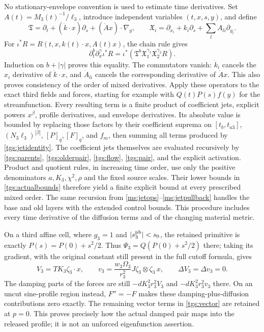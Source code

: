No stationary-envelope convention is used to estimate time
derivatives. Set $A(t)=M_3(t)^{-1}/\ell_3$, introduce independent
variables $(t,x,s,y)$, and define
\begin{equation}\label{tgs:jetoperators}
 \mathfrak T=\partial_t+(\dot k\cdot x)\partial_s
                       +(\dot A x)\cdot\nabla_y,\qquad
 \mathfrak X_i=\partial_{x_i}+k_i\partial_s
                       +\sum_lA_{li}\partial_{y_l}.
\end{equation}
For $\iota^*R=R(t,x,k(t)\cdot x,A(t)x)$, the chain rule gives
\begin{equation}\label{tgs:jetidentity}
 \partial_t^b\partial_x^\gamma\iota^*R
   =\iota^*(\mathfrak T^b\mathfrak X_1^{\gamma_1}
                              \mathfrak X_2^{\gamma_2}R).
\end{equation}
Induction on $b+|\gamma|$ proves this equality. The commutators
vanish: $\dot k_i$ cancels the $x_i$ derivative of
$\dot k\cdot x$, and $\dot A_{li}$ cancels the corresponding
derivative of $\dot A x$. This also proves consistency of the
order of mixed derivatives.
Apply these operators to the exact third fields and forces,
starting for example with $Q(t)P(s)f(y)$ for the streamfunction.
Every resulting term is a finite product of coefficient jets,
explicit powers $x^\beta$, profile derivatives, and envelope
derivatives. Its absolute value is bounded by replacing those
factors by their coefficient suprema on $[t_b,t_{a3}]$,
$(N_3\ell_3)^{|\beta|}$, $[P]_q,[F]_q$, and $f_m$,
then summing all terms produced by \eqref{tgs:jetidentity}.
The coefficient jets themselves are evaluated recursively by
\eqref{tgs:parents}, \eqref{tgs:olderpair},
\eqref{tgs:flow}, \eqref{tgs:pair}, and
the explicit activation. Product and quotient rules, in increasing
time order, use only the positive denominators
$a,K_3,\chi^2,\rho$ and the fixed source scales.
Their lower bounds in \eqref{tgs:actualbounds} therefore yield
a finite explicit bound at every prescribed mixed order. The same
recursion from \eqref{ms:jetops}--\eqref{ms:jetpullback} handles
the base and old layers with the extended control bounds. This
procedure includes every time derivative of the diffusion terms
and of the changing material metric.

On a third affine cell, where $g_3=1$ and $|s_3^{\rm ph}|<s_0$,
the retained primitive is exactly $P(s)=P(0)+s^2/2$. Thus
$\Psi_3=Q(P(0)+s^2/2)$ there; taking its gradient, with the
original constant still present in the full cutoff formula, gives
\begin{equation}\label{tgs:affinecell}
 V_3=T K_3\zeta_3\cdot x,\qquad
 v_3=\frac{w_3\Omega_3}{r_3^2}
                  J\zeta_3\otimes\zeta_3\,x,
 \qquad\Delta V_3=\Delta v_3=0.
\end{equation}
The damping parts of the forces are still
$-dK_3^2r_3^2 V_3$ and $-dK_3^2r_3^2 v_3$ there.
On an uncut sine-profile region instead, $F''=-F$ makes these
damping-plus-diffusion contributions zero exactly. The remaining
vector terms in \eqref{tgs:vector} are retained at $p=0$.
This proves precisely how the actual damped pair maps into the
released profile; it is not an unforced eigenfunction assertion.

